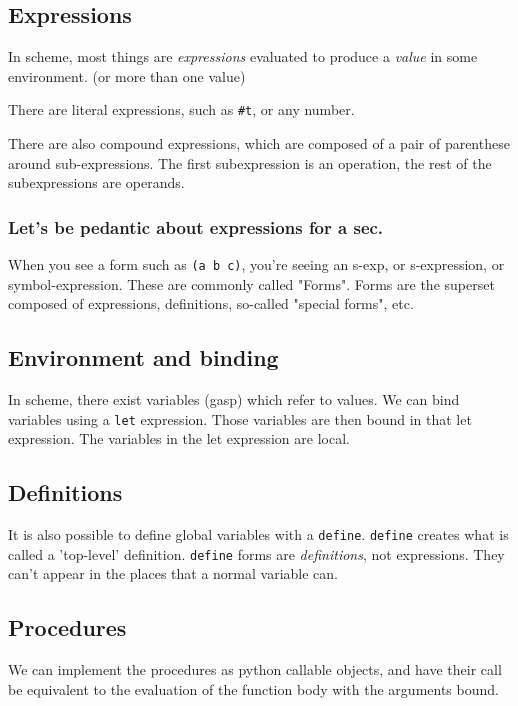 \documentclass[11pt]{article}
\begin{document}
\subsection{Expressions}
\label{sec:org594a798}
In scheme, most things are \emph{expressions} evaluated to produce a
\emph{value} in some environment. (or more than one value)

There are literal expressions, such as \texttt{\#t}, or any number.

There are also compound expressions, which are composed of a pair
of parenthese around sub-expressions. The first subexpression is an
operation, the rest of the subexpressions are operands.

\subsubsection{Let's be pedantic about expressions for a sec.}
\label{sec:org985e5cf}
When you see a form such as \texttt{(a b c)}, you're seeing an s-exp, or
s-expression, or symbol-expression. These are commonly called
"Forms". Forms are the superset composed of expressions,
definitions, so-called "special forms", etc.

\subsection{Environment and binding}
\label{sec:org2e2a582}
In scheme, there exist variables (gasp) which refer to values. We
can bind variables using a \texttt{let} expression. Those variables are
then bound in that let expression. The variables in the let
expression are local.

\subsection{Definitions}
\label{sec:org8e57047}
It is also possible to define global variables with a
\texttt{define}. \texttt{define} creates what is called a 'top-level'
definition. \texttt{define} forms are \emph{definitions}, not
expressions. They can't appear in the places that a normal variable
can.

\subsection{Procedures}
\label{sec:org4c670fc}
We can implement the procedures as python callable objects, and
have their call be equivalent to the evaluation of the function
body with the arguments bound.
\end{document}
